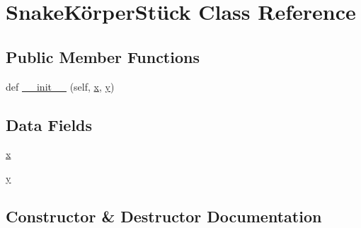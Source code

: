 \hypertarget{class_projekt_01_snake_01auf_01_python_1_1_snake_k_xC3_xB6rper_st_xC3_xBCck}{}\section{Snake\+Körper\+Stück Class Reference}
\label{class_projekt_01_snake_01auf_01_python_1_1_snake_k_xC3_xB6rper_st_xC3_xBCck}
\subsection*{Public Member Functions}
\begin{DoxyCompactItemize}
\item 
def \mbox{\hyperlink{class_projekt_01_snake_01auf_01_python_1_1_snake_k_xC3_xB6rper_st_xC3_xBCck_a920a2e8c450da87a2461e7913e14cb22}{\+\_\+\+\_\+init\+\_\+\+\_\+}} (self, \mbox{\hyperlink{class_projekt_01_snake_01auf_01_python_1_1_snake_k_xC3_xB6rper_st_xC3_xBCck_a9336ebf25087d91c818ee6e9ec29f8c1}{x}}, \mbox{\hyperlink{class_projekt_01_snake_01auf_01_python_1_1_snake_k_xC3_xB6rper_st_xC3_xBCck_a2fb1c5cf58867b5bbc9a1b145a86f3a0}{y}})
\end{DoxyCompactItemize}
\subsection*{Data Fields}
\begin{DoxyCompactItemize}
\item 
\mbox{\hyperlink{class_projekt_01_snake_01auf_01_python_1_1_snake_k_xC3_xB6rper_st_xC3_xBCck_a9336ebf25087d91c818ee6e9ec29f8c1}{x}}
\item 
\mbox{\hyperlink{class_projekt_01_snake_01auf_01_python_1_1_snake_k_xC3_xB6rper_st_xC3_xBCck_a2fb1c5cf58867b5bbc9a1b145a86f3a0}{y}}
\end{DoxyCompactItemize}


\subsection{Constructor \& Destructor Documentation}
\mbox{\label{class_projekt_01_snake_01auf_01_python_1_1_snake_k_xC3_xB6rper_st_xC3_xBCck_a920a2e8c450da87a2461e7913e14cb22}} 

